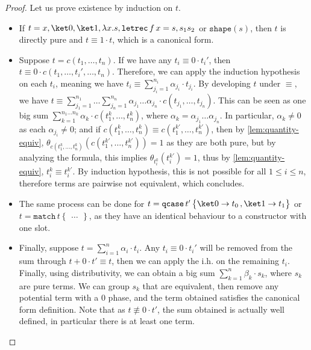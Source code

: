 \documentclass[10pt,a4paper]{article}
\newcommand{\textqcase}{\ensuremath{\mathtt{qcase}}}
\newcommand{\textmatch}{\ensuremath{\mathtt{match}}}
\newcommand{\textletrec}{\ensuremath{\mathtt{letrec}}}
\newcommand{\zket}{\ket 0}
\newcommand{\oket}{\ket 1}
\newcommand{\qcasebase}[2]{
  \textqcase\,#1\left\{\! \begin{aligned} #2 \end{aligned}\right\}
}
\newcommand{\qcase}[3]{
  \qcasebase {#1} {\zket \to #2\,, \oket \to #3}
}
\newcommand{\qcasedefault}[1]{\ensuremath{\qcase{#1}{t_0}{t_1}}}
\newcommand{\match}[2]{
  \textmatch\,#1\left\{\! \begin{aligned} #2 \end{aligned}\right\}
}
\newcommand{\lbd}[2]{\lambda #1 .#2}
\newcommand{\letrec}[3]{\textletrec\,#1\,#2=#3}
\newcommand{\shape}[1]{\mathtt{shape}(#1)}
\newcommand{\qt}[2]{\theta_{#1}(#2)}
\begin{document}
\begin{proof}
  Let us prove existence by induction on $t$.

  \begin{itemize}
    \item If $t = x, \zket, \oket, \lbd x s, \letrec f x s, s_1 s_2$ or $\shape
      s$, then $t$ is directly pure and $t \equiv 1 \cdot t$, which is a
      canonical form.
    \item Suppose $t = c(t_1, \dots, t_n)$. If we have any $t_i
      \equiv 0 \cdot t_i'$, then $t \equiv 0 \cdot c(t_1, \dots,
      t_i', \dots, t_n)$.
      Therefore, we can apply the induction hypothesis on each $t_i$,
      meaning we have $t_i \equiv \sum_{j_i = 1}^{n_i} \alpha_{j_i}
      \cdot t_{j_i}$.
      By developing $t$ under $\equiv$, we have $t \equiv
      \sum_{j_1=1}^{n_1} \dots \sum_{j_n=1}^{n_n} \alpha_{j_1} \dots
      \alpha_{j_n} \cdot c(t_{j_1}, \dots, t_{j_n})$.
      This can be seen as one big sum $\sum_{k=1}^{n_1 \dots n_k}
      \alpha_k \cdot c(t_1^k, \dots, t_n^k)$, where $\alpha_k =
      \alpha_{j_1} \dots \alpha_{j_n}$.
      In particular, $\alpha_k \neq 0$ as each $\alpha_{j_i} \neq 0$;
      and if $c(t_1^k, \dots, t_n^k) \equiv c(t_1^{k'}, \dots,
      t_n^{k'})$, then by \autoref{lem:quantity-equiv},
      $\qt {c(t_1^k, \dots, t_n^k)} {c(t_1^{k'}, \dots, t_n^{k'})} =
      1$ as they are both pure,
      but by analyzing the formula, this implies $\qt {t_i^k}
      {t_i^{k'}} = 1$, thus by \autoref{lem:quantity-equiv}, $t_i^k
      \equiv t_i^{k'}$.
      By induction hypothesis, this is not possible for all $1 \leq i
      \leq n$, therefore terms are pairwise not equivalent, which concludes.
    \item The same process can be done for $t = \qcasedefault{t'}$ or $t
      = \match t \dots$, as they have an identical behaviour to a
      constructor with one slot.
    \item Finally, suppose $t = \sum_{i=1}^n \alpha_i \cdot t_i$.
      Any $t_i \equiv 0 \cdot t_i'$ will be removed from the sum
      through $t + 0 \cdot t' \equiv t$, then we can apply the i.h.
      on the remaining $t_i$.
      Finally, using distributivity, we can obtain a big sum
      $\sum_{k=1}^n \beta_k \cdot s_k$, where $s_k$ are pure terms.
      We can group $s_k$ that are equivalent, then remove any
      potential term with a $0$ phase, and the term obtained
      satisfies the canonical form definition.
      Note that as $t \not\equiv 0 \cdot t'$, the sum obtained is
      actually well defined, in particular there is at least one term.
  \end{itemize}


\end{proof}
\end{document}
